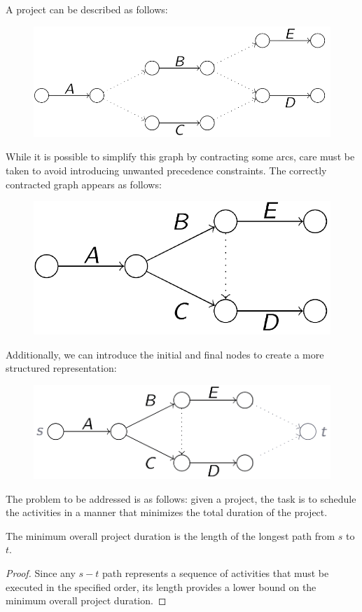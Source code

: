 \documentclass[12pt, a4paper]{report}
\begin{document}
    \begin{example}
        A project can be described as follows:
        \begin{figure}[H]
            \centering
            \includegraphics[width=0.5\linewidth]{images/project.png}
        \end{figure}
        While it is possible to simplify this graph by contracting some arcs, care must be taken to avoid introducing unwanted precedence constraints. 
        The correctly contracted graph appears as follows:
        \begin{figure}[H]
            \centering
            \includegraphics[width=0.4\linewidth]{images/cproject.png}
        \end{figure}
        Additionally, we can introduce the initial and final nodes to create a more structured representation:
        \begin{figure}[H]
            \centering
            \includegraphics[width=0.5\linewidth]{images/fproject.png}
        \end{figure}
    \end{example}
    The problem to be addressed is as follows: given a project, the task is to schedule the activities in a manner that minimizes the total duration of the project.
    \begin{property}
        The minimum overall project duration is the length of the longest path from $s$ to $t$. 
    \end{property}
    \begin{proof}
        Since any $s-t$ path represents a sequence of activities that must be executed in the specified order, its length provides a lower bound on the minimum overall project duration. 
    \end{proof}  
\end{document}
